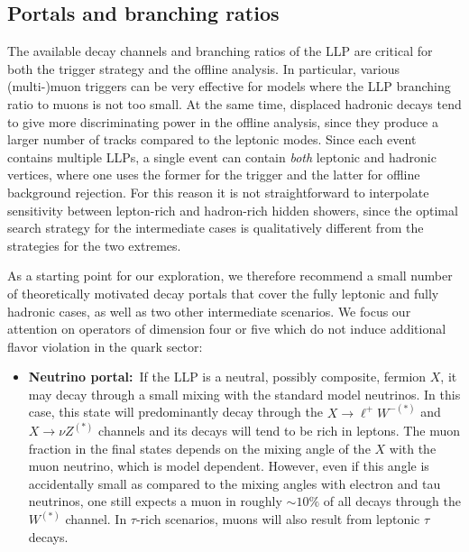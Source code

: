 \begin{enumerate}
\subsection{Portals and branching ratios}
\label{sec:darkshowerportal}

The available decay channels and branching ratios of the LLP are critical  for both the trigger strategy and the offline analysis. In particular, various (multi-)muon triggers can be very effective for models where the LLP branching ratio to muons is not too small. At the same time, displaced hadronic decays tend to give more discriminating power in the offline analysis, since they produce a larger number of tracks compared to the leptonic modes. Since each event contains multiple LLPs, a single event can contain \emph{both} leptonic and hadronic vertices, where one uses the former for the trigger and the latter for offline background rejection. For this reason it is not straightforward to interpolate  sensitivity between lepton-rich and hadron-rich hidden showers, since the optimal search strategy for the intermediate cases is qualitatively different from the strategies for the two extremes.

As a starting point for our exploration, we therefore recommend a small number of theoretically motivated decay portals that cover the fully leptonic and fully hadronic cases, as well as two other intermediate scenarios. We focus our attention on operators of dimension four or five which do not induce additional flavor violation in the quark sector:

\begin{itemize}
\item {\bf Neutrino portal:}~If the LLP is a neutral, possibly composite, fermion $X$, it may decay through a small mixing with the standard model neutrinos. In this case, this state will predominantly decay through the $X\to \ell^+ W^{-(\ast)}$ and $X\to \nu Z^{(\ast)}$ channels and its decays will tend to be rich in leptons. The muon fraction in the final states depends on the mixing angle of the $X$ with the muon neutrino, which is model dependent. However, even if this angle is accidentally small as compared to the mixing angles with electron and tau neutrinos, one still expects a muon in roughly $\sim10\%$ of all decays through the $W^{(\ast)}$ channel. In $\tau$-rich scenarios,  muons will also result from leptonic $\tau$ decays.


\end{itemize}
\end{enumerate}
